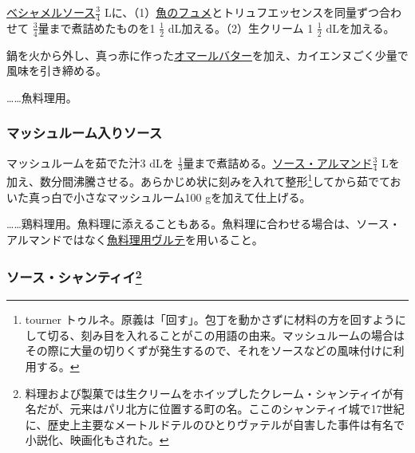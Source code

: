 \begin{recette}
\protect\hyperlink{sauce-bechamel}{ベシャメルソース}\(\frac{3}{4}\)
Lに、（1）\protect\hyperlink{fumet-de-poisson}{魚のフュメ}とトリュフエッセンスを同量ずつ合わせて
\(\frac{3}{4}\)量まで煮詰めたものを1 \(\frac{1}{2}\)
dL加える。（2）生クリーム 1 \(\frac{1}{2}\) dLを加える。

鍋を火から外し、真っ赤に作った\protect\hyperlink{beurre-de-homard}{オマールバター}を加え、カイエンヌごく少量で風味を引き締める。

\ldots{}\ldots{}魚料理用。

\hypertarget{sauce-aux-champignons-blanche}{%
\subsubsection{マッシュルーム入りソース}\label{sauce-aux-champignons-blanche}}



マッシュルームを茹でた汁3 dLを
\(\frac{1}{3}\)量まで煮詰める。\protect\hyperlink{sauce-allemande}{ソース・アルマンド}\(\frac{3}{4}\)
Lを加え、数分間沸騰させる。あらかじめ状に刻みを入れて整形\footnote{tourner
  トゥルネ。原義は「回す」。包丁を動かさずに材料の方を回すようにして切る、刻み目を入れることがこの用語の由来。マッシュルームの場合はその際に大量の切りくずが発生するので、それをソースなどの風味付けに利用する。}してから茹でておいた真っ白で小さなマッシュルーム100
gを加えて仕上げる。

\ldots{}\ldots{}鶏料理用。魚料理に添えることもある。魚料理に合わせる場合は、ソース・アルマンドではなく\protect\hyperlink{veloute-de-poisson}{魚料理用ヴルテ}を用いること。

\hypertarget{sauce-chantilly}{%
\subsubsection[ソース・シャンティイ]{\texorpdfstring{ソース・シャンティイ\footnote{料理および製菓では生クリームをホイップしたクレーム・シャンティイが有名だが、元来はパリ北方に位置する町の名。ここのシャンティイ城で17世紀に、歴史上主要なメートルドテルのひとりヴァテルが自害した事件は有名で小説化、映画化もされた。}}{ソース・シャンティイ}}\label{sauce-chantilly}}


\end{recette}
